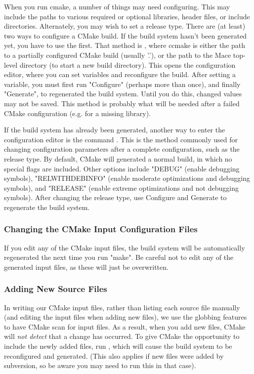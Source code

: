 When you run cmake, a number of things may need configuring.  This may
include the paths to various required or optional libraries, header
files, or include directories.  Alternately, you may wish to set a
release type.  There are (at least) two ways to configure a CMake build.
If the build system hasn't been generated yet, you have to use the
first.  That method is , where ccmake is either
the path to a partially configured CMake build (usually '.'), or the
path to the Mace top-level directory (to start a new build directory).
This opens the configuration editor, where you can set variables and
reconfigure the build.  After setting a variable, you must first run
"Configure" (perhaps more than once), and finally "Generate", to
regenerated the build system.  Until you do this, changed values may not
be saved.  This method is probably what will be needed after a failed
CMake configuration (e.g. for a missing library).  

If the build system has already been generated, another way to enter the
configuration editor is the command .  This is
the method commonly used for changing configuration parameters after a
complete configuration, such as the release type.  By default, CMake
will generated a normal build, in which no special flags are included.
Other options include "DEBUG" (enable debugging symbols),
"RELWITHDEBINFO" (enable moderate optimizations and debugging symbols),
and "RELEASE" (enable extreme optimizations and not debugging symbols).
After changing the release type, use Configure and Generate to
regenerate the build system.

\subsubsection{Changing the CMake Input Configuration Files}

If you edit any of the CMake input files, the build system will be
automatically regenerated the next time you run "make".  Be careful not
to edit any of the generated input files, as these will just be
overwritten.

\subsubsection{Adding New Source Files}

In writing our CMake input files, rather than listing each source file
manually (and editing the input files when adding new files), we use the
globbing features to have CMake scan for input files.  As a result, when
you add new files, CMake will \emph{not detect} that a change has
occurred.  To give CMake the opportunity to include the newly added
files, run , which will cause the build
system to be reconfigured and generated.  (This also applies if new
files were added by subversion, so be aware you may need to run this in
that case).

